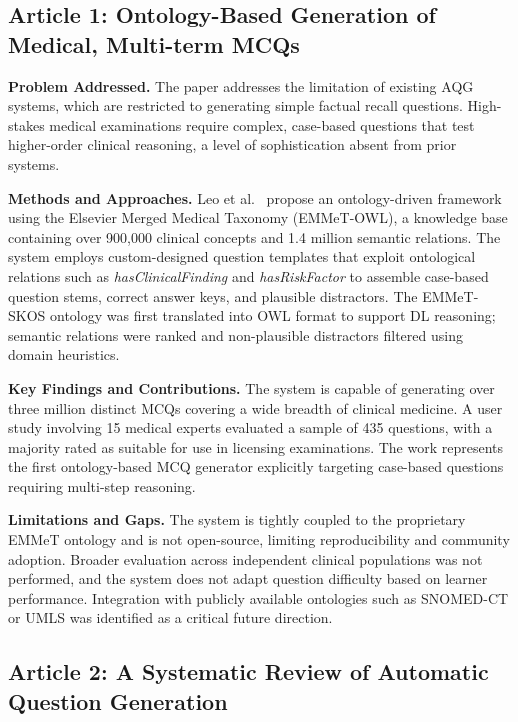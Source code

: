 \documentclass[conference]{IEEEtran}
\begin{document}
\subsection{Article 1: Ontology-Based Generation of Medical, Multi-term MCQs~\cite{leo2019ontology}}

\textbf{Problem Addressed.} The paper addresses the limitation of existing AQG systems, which are restricted to generating simple factual recall questions. High-stakes medical examinations require complex, case-based questions that test higher-order clinical reasoning, a level of sophistication absent from prior systems.

\textbf{Methods and Approaches.} Leo et al.~\cite{leo2019ontology} propose an ontology-driven framework using the Elsevier Merged Medical Taxonomy (EMMeT-OWL), a knowledge base containing over 900,000 clinical concepts and 1.4 million semantic relations. The system employs custom-designed question templates that exploit ontological relations such as \textit{hasClinicalFinding} and \textit{hasRiskFactor} to assemble case-based question stems, correct answer keys, and plausible distractors. The EMMeT-SKOS ontology was first translated into OWL format to support DL reasoning; semantic relations were ranked and non-plausible distractors filtered using domain heuristics.

\textbf{Key Findings and Contributions.} The system is capable of generating over three million distinct MCQs covering a wide breadth of clinical medicine. A user study involving 15 medical experts evaluated a sample of 435 questions, with a majority rated as suitable for use in licensing examinations. The work represents the first ontology-based MCQ generator explicitly targeting case-based questions requiring multi-step reasoning.

\textbf{Limitations and Gaps.} The system is tightly coupled to the proprietary EMMeT ontology and is not open-source, limiting reproducibility and community adoption. Broader evaluation across independent clinical populations was not performed, and the system does not adapt question difficulty based on learner performance. Integration with publicly available ontologies such as SNOMED-CT or UMLS was identified as a critical future direction.

\subsection{Article 2: A Systematic Review of Automatic Question Generation~\cite{kurdi2020systematic}}
\end{document}
